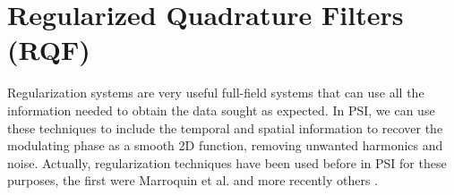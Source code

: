 \section{Regularized Quadrature Filters (RQF)}

Regularization systems are very useful full-field systems
that can use all the information needed to obtain the data sought as
expected. In PSI, we can use these techniques to include the temporal
and spatial information to recover the modulating phase as a smooth
2D function, removing unwanted harmonics and noise. Actually,
regularization techniques have been used before in PSI for these
purposes, the first were Marroquin et al. \cite{RQF,AQF,AQF_mult} and more
recently others \cite{RPT, RQPT, Mariano, Mariano2, Vargas,Medina,Zeng}.









